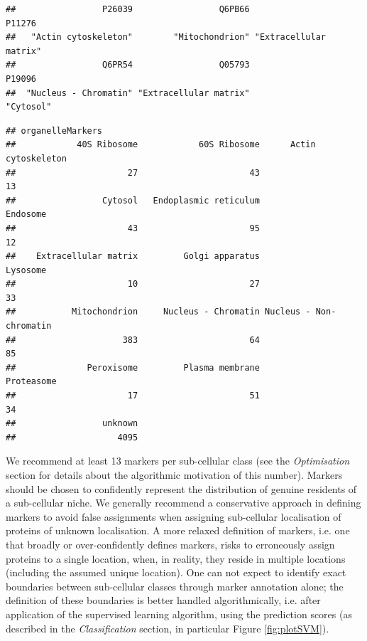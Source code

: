 \begin{knitrout}
\color{fgcolor}\begin{kframe}
\begin{alltt}
 \hlkwb{<-} \hlstd{(} \hlstd{=} \hlstd{)}
\end{alltt}
\begin{verbatim}
##                 P26039                 Q6PB66                 P11276 
##   "Actin cytoskeleton"        "Mitochondrion" "Extracellular matrix" 
##                 Q6PR54                 Q05793                 P19096 
##  "Nucleus - Chromatin" "Extracellular matrix"              "Cytosol"
\end{verbatim}
\begin{alltt}
 \hlkwb{<-} 
\end{alltt}


{\ttfamily\noindent\itshape\color{messagecolor}{\#\# Markers in data: 937 out of 5032}}\begin{verbatim}
## organelleMarkers
##            40S Ribosome            60S Ribosome      Actin cytoskeleton 
##                      27                      43                      13 
##                 Cytosol   Endoplasmic reticulum                Endosome 
##                      43                      95                      12 
##    Extracellular matrix         Golgi apparatus                Lysosome 
##                      10                      27                      33 
##           Mitochondrion     Nucleus - Chromatin Nucleus - Non-chromatin 
##                     383                      64                      85 
##              Peroxisome         Plasma membrane              Proteasome 
##                      17                      51                      34 
##                 unknown 
##                    4095
\end{verbatim}
\end{kframe}
\end{knitrout}

We recommend at least 13 markers per sub-cellular class (see the
\textit{Optimisation} section for details about the algorithmic
motivation of this number). Markers should be chosen to confidently
represent the distribution of genuine residents of a sub-cellular
niche. We generally recommend a conservative approach in defining
markers to avoid false assignments when assigning sub-cellular
localisation of proteins of unknown localisation. A more relaxed
definition of markers, i.e. one that broadly or over-confidently
defines markers, risks to erroneously assign proteins to a single
location, when, in reality, they reside in multiple locations
(including the assumed unique location). One can not expect to
identify exact boundaries between sub-cellular classes through marker
annotation alone; the definition of these boundaries is better handled
algorithmically, i.e. after application of the supervised learning
algorithm, using the prediction scores (as described in the
\textit{Classification} section, in particular Figure
\ref{fig:plotSVM}).

